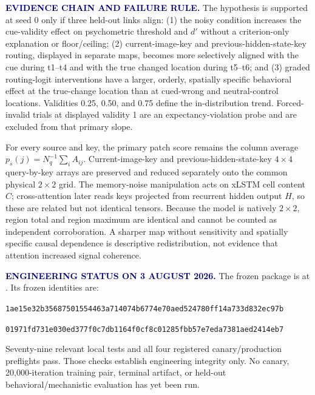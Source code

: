 \documentclass[11pt]{article}
\newcommand{\smallcapslabel}[1]{\textcolor{Navy}{\sffamily\bfseries\footnotesize\MakeUppercase{#1}}}
\begin{document}
\smallcapslabel{Evidence chain and failure rule.}
The hypothesis is supported at seed 0 only if three held-out links align: (1) the noisy condition increases the cue-validity effect on psychometric threshold and $d'$ without a criterion-only explanation or floor/ceiling; (2) current-image-key and previous-hidden-state-key routing, displayed in separate maps, becomes more selectively aligned with the cue during t1--t4 and with the true changed location during t5--t6; and (3) graded routing-logit interventions have a larger, orderly, spatially specific behavioral effect at the true-change location than at cued-wrong and neutral-control locations. Validities 0.25, 0.50, and 0.75 define the in-distribution trend. Forced-invalid trials at displayed validity 1 are an expectancy-violation probe and are excluded from that primary slope.

For every source and key, the primary patch score remains the column average $p_s(j)=N_q^{-1}\sum_i A_{ij}$. Current-image-key and previous-hidden-state-key $4\times4$ query-by-key arrays are preserved and reduced separately onto the common physical $2\times2$ grid. The memory-noise manipulation acts on xLSTM cell content $C$; cross-attention later reads keys projected from recurrent hidden output $H$, so these are related but not identical tensors. Because the model is natively $2\times2$, region total and region maximum are identical and cannot be counted as independent corroboration. A sharper map without sensitivity and spatially specific causal dependence is descriptive redistribution, not evidence that attention increased signal coherence.

\smallcapslabel{Engineering status on 3 August 2026.}
The frozen package is at . Its frozen identities are:
\begin{description}[leftmargin=1.35in,labelwidth=1.18in,itemsep=1pt,topsep=3pt]
  \item[Design SHA-256] \texttt{1ae15e32\allowbreak b3568750\allowbreak 1554463a\allowbreak 714074b6\allowbreak 774e70ae\allowbreak d524780f\allowbreak f14a733d\allowbreak 832ec97b}
  \item[Config SHA-256] \texttt{01971fd7\allowbreak 31e030ed\allowbreak 377f0c7d\allowbreak b1164f0c\allowbreak f8c01285\allowbreak fbb57e7e\allowbreak da7381ae\allowbreak d2414eb7}
\end{description}
Seventy-nine relevant local tests and all four registered canary/production preflights pass. Those checks establish engineering integrity only. No canary, 20,000-iteration training pair, terminal artifact, or held-out behavioral/mechanistic evaluation has yet been run.
\end{document}
